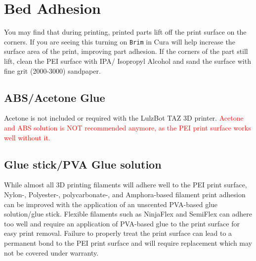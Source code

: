 
\section{Bed Adhesion}
You may find that during printing, printed parts lift off the print surface on the corners. If you are seeing this turning on \texttt{Brim} in Cura will help increase the surface area of the print, improving part adhesion. If the corners of the part still lift, clean the PEI surface with IPA/ Isopropyl Alcohol and sand the surface with fine grit (2000-3000) sandpaper. 


\subsection{ABS/Acetone Glue}
\label{sec:ABS/Acetone Glue}

Acetone is not included or required with the LulzBot TAZ 3D printer. \textcolor{red}{Acetone and ABS solution is NOT recommended anymore, as the PEI print surface works well without it.}

\subsection{Glue stick/PVA Glue solution}
\label{sec:Glue stick/PVA Glue solution}
While almost all 3D printing filaments will adhere well to the PEI print surface, Nylon-, Polyester-, polycarbonate-, and Amphora\textsuperscript{\miniscule{\texttrademark}}-based filament print adhesion can be improved with the application of an unscented PVA-based glue solution/glue stick. Flexible filaments such as NinjaFlex\textsuperscript{\miniscule{\textregistered}} and SemiFlex\textsuperscript{\miniscule{\texttrademark}} can adhere too well and require an application of PVA-based glue to the print surface for easy print removal. Failure to properly treat the print surface can lead to a permanent bond to the PEI print surface and will require replacement which may not be covered under warranty.

